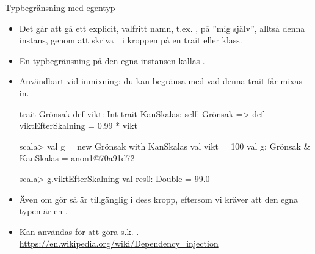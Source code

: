 \begin{Slide}{Typbegränsning med egentyp }\SlideFontSmall
\begin{itemize}\SlideFontTiny
  \item Det går att gå ett explicit, valfritt namn, t.ex. ,  på ''mig själv'', alltså denna instans, genom att skriva~~i kroppen på en trait eller klass. 
  \item En typbegränsning på den egna instansen kallas  . 
  \item Användbart vid inmixning: du kan begränsa med vad denna trait får mixas in.
\begin{Code}
trait Grönsak { def vikt: Int }
trait KanSkalas:
  self: Grönsak =>
  def viktEfterSkalning = 0.99 * vikt 
\end{Code}
\begin{REPLsmall}
scala> val g = new Grönsak with KanSkalas { val vikt = 100 }
val g: Grönsak & KanSkalas = anon1@70a91d72
                                                                                    
scala> g.viktEfterSkalning
val res0: Double = 99.0
\end{REPLsmall}
\item Även om   gör  så är   tillgänglig i dess kropp, eftersom vi kräver att den egna typen är en .
\item Kan användas för att göra s.k.  .\\\url{https://en.wikipedia.org/wiki/Dependency_injection}
\end{itemize}

\end{Slide}


